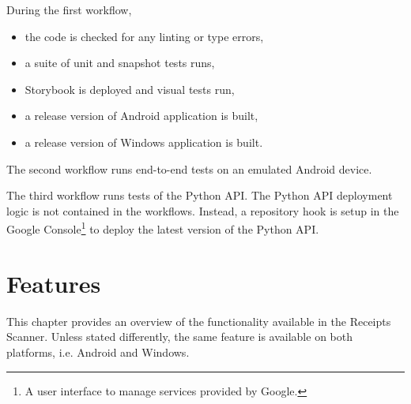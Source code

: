 \documentclass[
  digital, %
  table,   %
  oneside, %
  lof,     %
  lot,     %
]{fithesis3}
\begin{document}
During the first workflow,
\begin{itemize}
    \item the code is checked for any linting or type errors,
    \item a suite of unit and snapshot tests runs,
    \item Storybook is deployed and visual tests run,
    \item a release version of Android application is built,
    \item a release version of Windows application is built.
\end{itemize}

The second workflow runs end-to-end tests on an emulated Android device.

The third workflow runs tests of the Python API. The Python API deployment logic is not contained in the workflows. Instead, a repository hook is setup in the Google Console\footnote{A user interface to manage services provided by Google.} to deploy the latest version of the Python API.

\chapter{Features}
This chapter provides an overview of the functionality available in the Receipts Scanner. Unless stated differently, the same feature is available on both platforms, i.e. Android and Windows.
\end{document}
